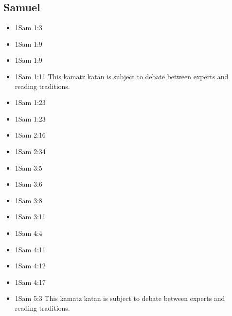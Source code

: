 \documentclass[14pt]{book}
\begin{document}
	\subsection{Samuel}
		
	\begin{multicols}{2}\begin{itemize}
					
					\item 1Sam 1:3
					
					\item 1Sam 1:9
					
					\item 1Sam 1:9
					
					\item 1Sam 1:11 This kamatz katan is subject to debate between experts and reading traditions.
					
					\item 1Sam 1:23
					
					\item 1Sam 1:23
							
							\item 1Sam 2:16
							
							\item 1Sam 2:34
							
							\item 1Sam 3:5
							
							\item 1Sam 3:6
							
							\item 1Sam 3:8
							
							\item 1Sam 3:11
							
							\item 1Sam 4:4
							
							\item 1Sam 4:11
							
							\item 1Sam 4:12
							
							\item 1Sam 4:17
							
							\item 1Sam 5:3 This kamatz katan is subject to debate between experts and reading traditions.
							

\end{itemize}
\end{multicols}
\end{document}
